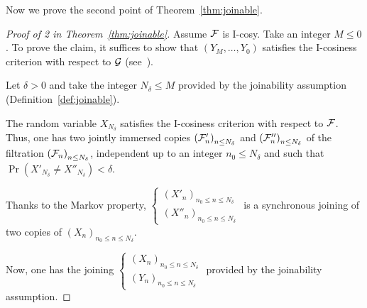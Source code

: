 \documentclass[12pt,a4paper]{article}
\begin{document}
Now we  prove the second point of Theorem~\ref{thm:joinable}.

\begin{proof}[Proof of 2 in Theorem~\ref{thm:joinable}]

Assume $\mathcal{F}$ is I-cosy. Take an integer $M \leq 0$. 
To prove the claim, it suffices to show that $(Y_M, \ldots, Y_0)$ 
satisfies the I-cosiness criterion with respect to $\mathcal{G}$ 
(see~\cite{LauXLIII}). 

Let $\delta>0$ and take the integer $N_\delta \leq M$ provided by the 
joinability assumption (Definition~\ref{def:joinable}).  

The random variable $X_{N_\delta}$ satisfies the I-cosiness criterion 
with respect to $\mathcal{F}$. Thus, one has two jointly immersed copies 
${(\mathcal{F}'_n)}_{n \leq N_\delta}$ and ${(\mathcal{F}''_n)}_{n \leq N_\delta}$ 
of the filtration ${(\mathcal{F}_n)}_{n \leq N_\delta}$, independent up to 
an integer $n_0 \leq N_\delta$ and  
 such that $\Pr(X'_{N_\delta} \neq X''_{N_\delta}) < \delta$. 



Thanks to the Markov property,  
$\left\{\begin{smallmatrix} {(X'_n)}_{n_0 \leq n \leq N_\delta} \\ 
{(X''_n)}_{n_0 \leq n \leq N_\delta}
\end{smallmatrix}\right.$ 
is a synchronous joining 
of two copies of ${(X_n)}_{n_0 \leq n \leq N_\delta}$. 

Now, one has the joining 
 $\left\{\begin{smallmatrix} {(X_n)}_{n_0 \leq n \leq N_\delta} \\ 
{(Y_n)}_{n_0 \leq n \leq N_\delta}
\end{smallmatrix}\right.$ provided by the joinability assumption. 



\end{proof}
\end{document}
